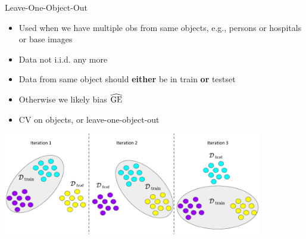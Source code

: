 \documentclass[11pt,compress,t,notes=noshow, xcolor=table]{beamer}
\begin{document}
\begin{vbframe}{Leave-One-Object-Out}

\begin{itemize}
    \item Used when we have multiple obs from same objects, e.g., persons 
        or hospitals or base images
    \item Data not i.i.d. any more
    \item Data from same object should \textbf{either} be in train \textbf{or}
        testset
    \item Otherwise we likely bias $\widehat{\mathrm{GE}}$
    \item CV on objects, or leave-one-object-out
\lz
\end{itemize}

\begin{knitrout}\scriptsize
{}\color{fgcolor}

{\centering \includegraphics[width=0.85\textwidth]{figure_man/loobject} 

}

\end{knitrout}
\end{vbframe}
\endlecture
\end{document}
